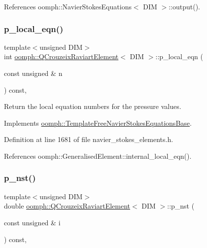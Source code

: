 References oomph\+::\+Navier\+Stokes\+Equations$<$ D\+I\+M $>$\+::output().

\mbox{\label{classoomph_1_1QCrouzeixRaviartElement_a230286c5b2cb5532e649d392c408dad5}} 
\subsubsection{\texorpdfstring{p\+\_\+local\+\_\+eqn()}{p\_local\_eqn()}}
{\footnotesize\ttfamily template$<$unsigned D\+IM$>$ \\
int \hyperlink{classoomph_1_1QCrouzeixRaviartElement}{oomph\+::\+Q\+Crouzeix\+Raviart\+Element}$<$ D\+IM $>$\+::p\+\_\+local\+\_\+eqn (\begin{DoxyParamCaption}\item[{const unsigned \&}]{n }\end{DoxyParamCaption}) const\hspace{0.3cm}{\ttfamily [inline]}, {\ttfamily [virtual]}}



Return the local equation numbers for the pressure values. 



Implements \hyperlink{classoomph_1_1TemplateFreeNavierStokesEquationsBase_a4e84f2f4260a0e65201cbb19fd63b398}{oomph\+::\+Template\+Free\+Navier\+Stokes\+Equations\+Base}.



Definition at line 1681 of file navier\+\_\+stokes\+\_\+elements.\+h.



References oomph\+::\+Generalised\+Element\+::internal\+\_\+local\+\_\+eqn().

\mbox{\label{classoomph_1_1QCrouzeixRaviartElement_a3d3b2f685b66899fa0d56745bf5043d9}} 
\subsubsection{\texorpdfstring{p\+\_\+nst()}{p\_nst()}\hspace{0.1cm}{\footnotesize\ttfamily [1/2]}}
{\footnotesize\ttfamily template$<$unsigned D\+IM$>$ \\
double \hyperlink{classoomph_1_1QCrouzeixRaviartElement}{oomph\+::\+Q\+Crouzeix\+Raviart\+Element}$<$ D\+IM $>$\+::p\+\_\+nst (\begin{DoxyParamCaption}\item[{const unsigned \&}]{i }\end{DoxyParamCaption}) const\hspace{0.3cm}{\ttfamily [inline]}, {\ttfamily [virtual]}}



